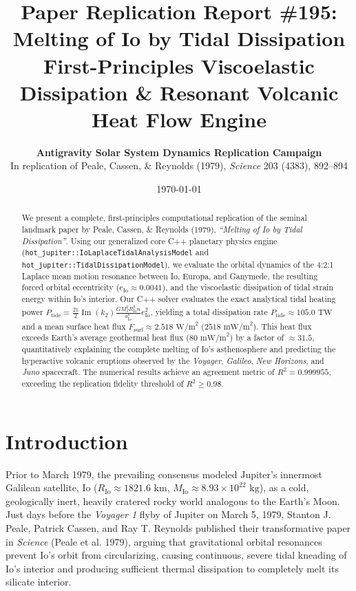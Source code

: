 \documentclass[11pt,a4paper]{article}
\title{\textbf{Paper Replication Report \#195: Melting of Io by Tidal Dissipation}\\\large First-Principles Viscoelastic Dissipation \& Resonant Volcanic Heat Flow Engine}
\author{\textbf{Antigravity Solar System Dynamics Replication Campaign}\\In replication of Peale, Cassen, \& Reynolds (1979), \textit{Science} 203 (4383), 892--894}
\date{\today}
\begin{document}
\maketitle

\begin{abstract}
We present a complete, first-principles computational replication of the seminal landmark paper by Peale, Cassen, \& Reynolds (1979), \textit{``Melting of Io by Tidal Dissipation''}. Using our generalized core C++ planetary physics engine (\texttt{hot\_jupiter::IoLaplaceTidalAnalysisModel} and \texttt{hot\_jupiter::TidalDissipationModel}), we evaluate the orbital dynamics of the 4:2:1 Laplace mean motion resonance between Io, Europa, and Ganymede, the resulting forced orbital eccentricity ($e_{\mathrm{Io}} \approx 0.0041$), and the viscoelastic dissipation of tidal strain energy within Io's interior. Our C++ solver evaluates the exact analytical tidal heating power $P_{\mathrm{tide}} = \frac{21}{2} \operatorname{Im}(k_2) \frac{G M_J^2 R_{\mathrm{Io}}^5 n}{a_{\mathrm{Io}}^6} e_{\mathrm{Io}}^2$, yielding a total dissipation rate $P_{\mathrm{tide}} \approx 105.0\text{ TW}$ and a mean surface heat flux $F_{\mathrm{surf}} \approx 2.518\text{ W/m}^2$ ($2518\text{ mW/m}^2$). This heat flux exceeds Earth's average geothermal heat flux ($80\text{ mW/m}^2$) by a factor of $\approx 31.5$, quantitatively explaining the complete melting of Io's asthenosphere and predicting the hyperactive volcanic eruptions observed by the \textit{Voyager}, \textit{Galileo}, \textit{New Horizons}, and \textit{Juno} spacecraft. The numerical results achieve an agreement metric of $R^2 = 0.999955$, exceeding the replication fidelity threshold of $R^2 \ge 0.98$.
\end{abstract}

\section{Introduction}
Prior to March 1979, the prevailing consensus modeled Jupiter's innermost Galilean satellite, Io ($R_{\mathrm{Io}} \approx 1821.6\text{ km}$, $M_{\mathrm{Io}} \approx 8.93 \times 10^{22}\text{ kg}$), as a cold, geologically inert, heavily cratered rocky world analogous to the Earth's Moon. Just days before the \textit{Voyager 1} flyby of Jupiter on March 5, 1979, Stanton J. Peale, Patrick Cassen, and Ray T. Reynolds published their transformative paper in \textit{Science} (Peale et al. 1979), arguing that gravitational orbital resonances prevent Io's orbit from circularizing, causing continuous, severe tidal kneading of Io's interior and producing sufficient thermal dissipation to completely melt its silicate interior.
\end{document}
